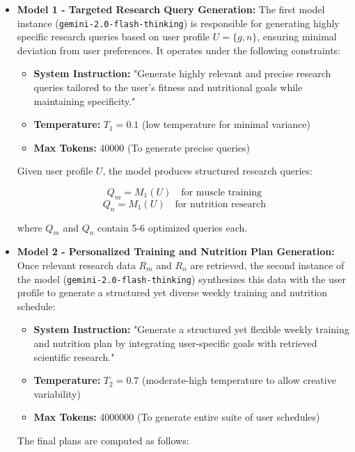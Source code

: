 \documentclass[conference]{IEEEtran}
\begin{document}
\begin{itemize}
    \item \textbf{Model 1 - Targeted Research Query Generation:}  
    The first model instance (\texttt{gemini-2.0-flash-thinking}) is responsible for generating highly specific research queries based on user profile $U = \{g, n\}$, ensuring minimal deviation from user preferences. It operates under the following constraints:

    \begin{itemize}
        \item \textbf{System Instruction:} "Generate highly relevant and precise research queries tailored to the user's fitness and nutritional goals while maintaining specificity."
        \item \textbf{Temperature:} $T_1 = 0.1$ (low temperature for minimal variance)
        \item \textbf{Max Tokens:} 40000 (To generate precise queries)
    \end{itemize}

    Given user profile $U$, the model produces structured research queries:
    
    \[
    Q_m = M_1(U) \quad \text{for muscle training}
    \]
    \[
    Q_n = M_1(U) \quad \text{for nutrition research}
    \]

    where $Q_m$ and $Q_n$ contain 5-6 optimized queries each.

    \item \textbf{Model 2 - Personalized Training and Nutrition Plan Generation:}  
    Once relevant research data $R_m$ and $R_n$ are retrieved, the second instance of the model (\texttt{gemini-2.0-flash-thinking}) synthesizes this data with the user profile to generate a structured yet diverse weekly training and nutrition schedule:

    \begin{itemize}
        \item \textbf{System Instruction:} "Generate a structured yet flexible weekly training and nutrition plan by integrating user-specific goals with retrieved scientific research."
        \item \textbf{Temperature:} $T_2 = 0.7$ (moderate-high temperature to allow creative variability)
        \item \textbf{Max Tokens:} 4000000 (To generate entire suite of user schedules)
    \end{itemize}

    The final plans are computed as follows:


\end{itemize}
\end{document}
